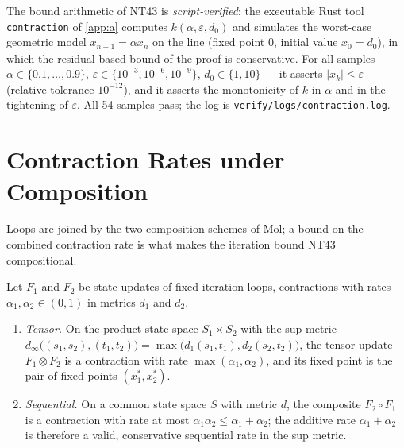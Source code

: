 \begin{remark}\label{rem:nt43-verified}
The bound arithmetic of NT43 is \emph{script-verified}: the executable Rust tool \texttt{contraction} of \autoref{app:a} computes $k(\alpha,\varepsilon,d_0)$ and simulates the worst-case geometric model $x_{n+1} = \alpha x_n$ on the line (fixed point $0$, initial value $x_0 = d_0$), in which the residual-based bound of the proof is conservative. For all samples --- $\alpha \in \{0.1,\ldots,0.9\}$, $\varepsilon \in \{10^{-3},10^{-6},10^{-9}\}$, $d_0 \in \{1,10\}$ --- it asserts $\lvert x_k \rvert \leq \varepsilon$ (relative tolerance $10^{-12}$), and it asserts the monotonicity of $k$ in $\alpha$ and in the tightening of $\varepsilon$. All 54 samples pass; the log is \texttt{verify/logs/contraction.log}.
\end{remark}

\section{Contraction Rates under Composition}\label{sec:trace-compose}

Loops are joined by the two composition schemes of Mol; a bound on the combined contraction rate is what makes the iteration bound NT43 compositional.

\begin{theorem}\label{nt:44}
Let $F_1$ and $F_2$ be state updates of fixed-iteration loops, contractions with rates $\alpha_1,\alpha_2 \in (0,1)$ in metrics $d_1$ and $d_2$.
\begin{enumerate}
\item[(i)] \emph{Tensor.} On the product state space $S_1 \times S_2$ with the sup metric $d_\infty\bigl((s_1,s_2),(t_1,t_2)\bigr) = \max\bigl(d_1(s_1,t_1),d_2(s_2,t_2)\bigr)$, the tensor update $F_1 \otimes F_2$ is a contraction with rate $\max(\alpha_1,\alpha_2)$, and its fixed point is the pair of fixed points $(x_1^{*},x_2^{*})$.
\item[(ii)] \emph{Sequential.} On a common state space $S$ with metric $d$, the composite $F_2 \circ F_1$ is a contraction with rate at most $\alpha_1\alpha_2 \leq \alpha_1 + \alpha_2$; the additive rate $\alpha_1 + \alpha_2$ is therefore a valid, conservative sequential rate in the sup metric.
\end{enumerate}
\end{theorem}

